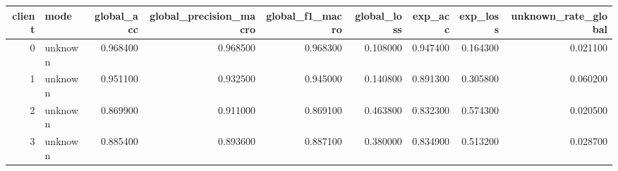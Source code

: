\begin{tabular}{rlrrrrrrr}
\toprule
client & mode & global_acc & global_precision_macro & global_f1_macro & global_loss & exp_acc & exp_loss & unknown_rate_global \\
\midrule
0 & unknown & 0.968400 & 0.968500 & 0.968300 & 0.108000 & 0.947400 & 0.164300 & 0.021100 \\
1 & unknown & 0.951100 & 0.932500 & 0.945000 & 0.140800 & 0.891300 & 0.305800 & 0.060200 \\
2 & unknown & 0.869900 & 0.911000 & 0.869100 & 0.463800 & 0.832300 & 0.574300 & 0.020500 \\
3 & unknown & 0.885400 & 0.893600 & 0.887100 & 0.380000 & 0.834900 & 0.513200 & 0.028700 \\
\bottomrule
\end{tabular}
